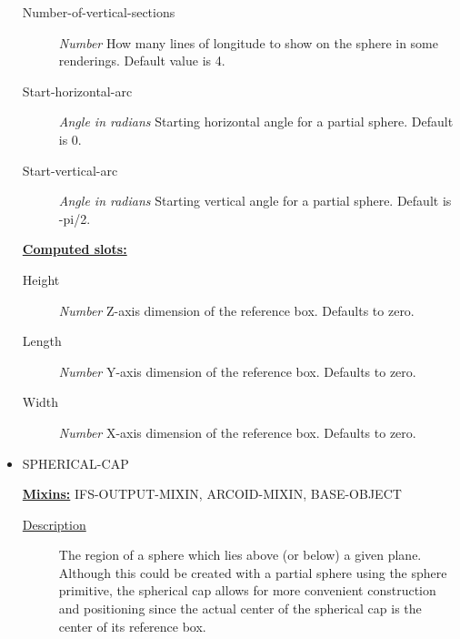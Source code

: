 \documentclass [11pt]{book}
\begin{document}
\begin{itemize}
\begin{description}
\item [Number-of-vertical-sections]
\emph{Number} How many lines of longitude to show on the sphere in some renderings. Default value is 4.


\item [Start-horizontal-arc]
\emph{Angle in radians} Starting horizontal angle for a partial sphere. Default is 0.


\item [Start-vertical-arc]
\emph{Angle in radians} Starting vertical angle for a partial sphere. Default is -pi/2.


\end{description}






\textbf{
\underline{Computed slots:}}

\begin{description}

\item [Height]
\emph{Number} Z-axis dimension of the reference box. Defaults to zero.


\item [Length]
\emph{Number} Y-axis dimension of the reference box. Defaults to zero.


\item [Width]
\emph{Number} X-axis dimension of the reference box. Defaults to zero.


\end{description}







\item {}SPHERICAL-CAP


\textbf{
\underline{Mixins:}} IFS-OUTPUT-MIXIN, ARCOID-MIXIN, BASE-OBJECT





\begin{description}

\item [
\underline{Description}]


The region of a sphere which lies above (or below) a given plane. Although this
could be created with a partial sphere using the sphere primitive, the spherical cap allows for more convenient
construction and positioning since the actual center of the spherical cap is the center of its reference box.




\end{description}
\end{itemize}
\end{document}
